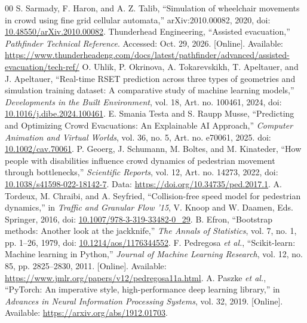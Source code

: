 \documentclass[conference]{IEEEtran}
\begin{document}
\begin{thebibliography}{00}
 S. Sarmady, F. Haron, and A. Z. Talib, ``Simulation of wheelchair movements in crowd using fine grid cellular automata,'' arXiv:2010.00082, 2020, doi: \href{https://doi.org/10.48550/arXiv.2010.00082}{10.48550/arXiv.2010.00082}.
 Thunderhead Engineering, ``Assisted evacuation,'' \emph{Pathfinder Technical Reference}. Accessed: Oct. 29, 2026. [Online]. Available: \url{https://www.thunderheadeng.com/docs/latest/pathfinder/advanced/assisted-evacuation/tech-ref/}
 O. Uhlik, P. Okrinova, A. Tokarevskikh, T. Apeltauer, and J. Apeltauer, ``Real-time RSET prediction across three types of geometries and simulation training dataset: A comparative study of machine learning models,'' \emph{Developments in the Built Environment}, vol. 18, Art. no. 100461, 2024, doi: \href{https://doi.org/10.1016/j.dibe.2024.100461}{10.1016/j.dibe.2024.100461}.
 E. Smania Testa and S. Raupp Musse, ``Predicting and Optimizing Crowd Evacuations: An Explainable AI Approach,'' \emph{Computer Animation and Virtual Worlds}, vol. 36, no. 5, Art. no. e70061, 2025. doi: \href{https://doi.org/10.1002/cav.70061}{10.1002/cav.70061}.
 P. Geoerg, J. Schumann, M. Boltes, and M. Kinateder, ``How people with disabilities influence crowd dynamics of pedestrian movement through bottlenecks,'' \emph{Scientific Reports}, vol. 12, Art. no. 14273, 2022, doi: \href{https://doi.org/10.1038/s41598-022-18142-7}{10.1038/s41598-022-18142-7}. Data: \url{https://doi.org/10.34735/ped.2017.1}.
 A. Tordeux, M. Chraibi, and A. Seyfried, ``Collision-free speed model for pedestrian dynamics,'' in \emph{Traffic and Granular Flow '15}, V. Knoop and W. Daamen, Eds. Springer, 2016, doi: \href{https://doi.org/10.1007/978-3-319-33482-0_29}{10.1007/978-3-319-33482-0\_29}.
 B. Efron, ``Bootstrap methods: Another look at the jackknife,'' \emph{The Annals of Statistics}, vol. 7, no. 1, pp. 1--26, 1979, doi: \href{https://doi.org/10.1214/aos/1176344552}{10.1214/aos/1176344552}.
 F. Pedregosa \emph{et al.}, ``Scikit-learn: Machine learning in Python,'' \emph{Journal of Machine Learning Research}, vol. 12, no. 85, pp. 2825--2830, 2011. [Online]. Available: \url{https://www.jmlr.org/papers/v12/pedregosa11a.html}.
 A. Paszke \emph{et al.}, ``PyTorch: An imperative style, high-performance deep learning library,'' in \emph{Advances in Neural Information Processing Systems}, vol. 32, 2019. [Online]. Available: \url{https://arxiv.org/abs/1912.01703}.
\end{thebibliography}
\end{document}
